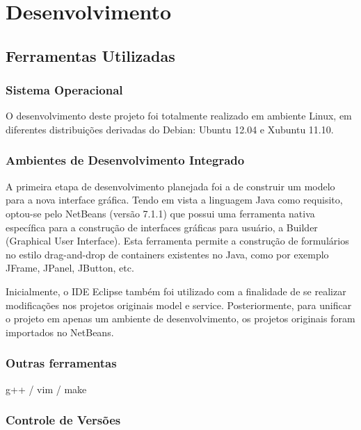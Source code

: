 
\chapter{Desenvolvimento} %

\section{Ferramentas Utilizadas}
\subsection{Sistema Operacional}

O desenvolvimento deste projeto foi totalmente realizado em ambiente Linux, em diferentes distribuições derivadas do Debian: Ubuntu 12.04 e Xubuntu 11.10.

\subsection{Ambientes de Desenvolvimento Integrado}

A primeira etapa de desenvolvimento planejada foi a de construir um modelo para a nova interface gráfica. Tendo em vista a linguagem Java como requisito, optou-se pelo  NetBeans (versão 7.1.1) que possui uma ferramenta nativa específica para a construção de interfaces gráficas para usuário, a  Builder (Graphical User Interface). Esta ferramenta permite a construção de formulários no estilo drag-and-drop de containers existentes no Java, como por exemplo JFrame, JPanel, JButton, etc.

Inicialmente, o IDE Eclipse também foi utilizado com a finalidade de se realizar modificações nos projetos originais model e service. Posteriormente, para unificar o projeto em apenas um ambiente de desenvolvimento, os projetos originais foram importados no NetBeans.

\subsection{Outras ferramentas}

 g++ / vim / make

\subsection{Controle de Versões}

